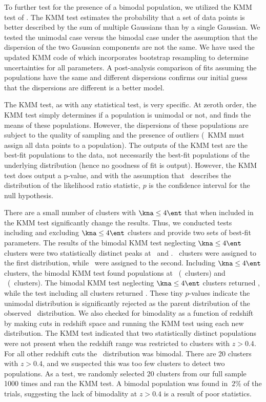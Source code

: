 To further test for the presence of a bimodal population, we utilized
the KMM test of \citet{kmm1}. The KMM test estimates the probability
that a set of data points is better described by the sum of multiple
Gaussians than by a single Gaussian. We tested the unimodal case
versus the bimodal case under the assumption that the dispersion of
the two Gaussian components are not the same. We have used the updated
KMM code of \citet{kmm2} which incorporates bootstrap resampling to
determine uncertainties for all parameters. A post-analysis comparison
of fits assuming the populations have the same and different
dispersions confirms our initial guess that the dispersions are
different is a better model.

The KMM test, as with any statistical test, is very specific. At
zeroth order, the KMM test simply determines if a population is
unimodal or not, and finds the means of these populations. However,
the dispersions of these populations are subject to the quality of
sampling and the presence of outliers (\eg\ KMM must assign all data
points to a population). The outputs of the KMM test are the best-fit
populations to the data, not necessarily the best-fit populations of
the underlying distribution (hence no goodness of fit is
output). However, the KMM test does output a p-value, and with the
assumption that \chisq\ describes the distribution of the likelihood
ratio statistic, $p$ is the confidence interval for the null
hypothesis.

There are a small number of clusters with $\kna \le 4 \ent$ that when
included in the KMM test significantly change the results. Thus, we
conducted tests including and excluding $\kna \le 4 \ent$ clusters and
provide two sets of best-fit parameters. The results of the bimodal
KMM test neglecting $\kna \le 4 \ent$ clusters were two statistically
distinct peaks at \kmma\ and \kmmb. \kmmc\ clusters were assigned to
the first distribution, while \kmmd\ were assigned to the
second. Including $\kna \le 4 \ent$ clusters, the bimodal KMM test
found populations at \kmmf\ (\kmmh\ clusters) and
\kmmg\ (\kmmi\ clusters). The bimodal KMM test neglecting $\kna \le 4
\ent$ clusters returned \kmme, while the test including all clusters
returned \kmmj. These tiny $p$-values indicate the unimodal
distribution is significantly rejected as the parent distribution of
the observed \kna\ distribution. We also checked for bimodality as a
function of redshift by making cuts in redshift space and running the
KMM test using each new distribution. The KMM test indicated that two
statistically distinct populations were not present when the redshift
range was restricted to clusters with $z > 0.4$. For all other
redshift cuts the \kna\ distribution was bimodal. There are 20
clusters with $z > 0.4$, and we suspected this was too few clusters to
detect two populations. As a test, we randomly selected 20 clusters
from our full sample 1000 times and ran the KMM test. A bimodal
population was found in $~2\%$ of the trials, suggesting the lack of
bimodality at $z > 0.4$ is a result of poor statistics.

